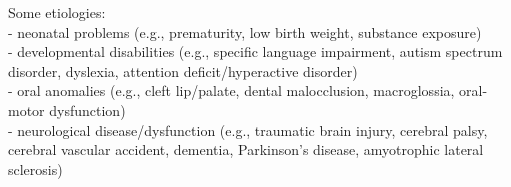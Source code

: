 Some etiologies:\\
- neonatal problems (e.g., prematurity, low birth weight, substance exposure)\\
- developmental disabilities (e.g., specific language impairment, autism spectrum
disorder, dyslexia, attention deficit/hyperactive disorder)\\
- oral anomalies (e.g., cleft lip/palate, dental malocclusion, macroglossia, oral-motor
dysfunction)\\
- neurological disease/dysfunction (e.g., traumatic brain injury, cerebral palsy, cerebral
vascular accident, dementia, Parkinson's disease, amyotrophic lateral sclerosis)\\



\begin{comment}
\section{Example glossary and acronyms}
%
%
This is the first occurrence of an abbreviation: \gls{abbrev}.

And now the second occurrence of the same abbreviation: \gls{abbrev}.

And a new acronym with capital letter: \Gls{xpt} and reused \gls{xpt}.

Lets add the term ``\gls{computer}'' to the glossary!

\end{comment}